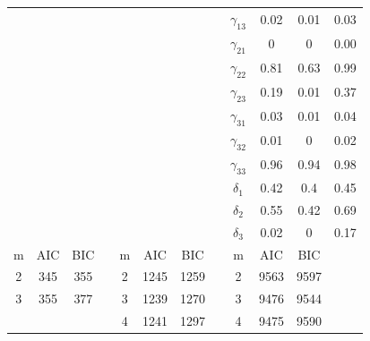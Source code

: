 \documentclass[]{interact}\usepackage[]{graphicx}\usepackage[dvipsnames]{xcolor}
\theoremstyle{plain}%
\theoremstyle{definition}
\theoremstyle{remark}
\begin{document}
\begin{table}[ht]
\begin{tabular}{cccc|cccc|cccc}
   &  &  &  &  &  &  &  & $\gamma_{13}$ & 0.02 & 0.01 & 0.03 \\ 
   &  &  &  &  &  &  &  & $\gamma_{21}$ & 0 & 0 & 0.00 \\ 
   &  &  &  &  &  &  &  & $\gamma_{22}$ & 0.81 & 0.63 & 0.99 \\ 
   &  &  &  &  &  &  &  & $\gamma_{23}$ & 0.19 & 0.01 & 0.37 \\ 
   &  &  &  &  &  &  &  & $\gamma_{31}$ & 0.03 & 0.01 & 0.04 \\ 
   &  &  &  &  &  &  &  & $\gamma_{32}$ & 0.01 & 0 & 0.02 \\ 
   &  &  &  &  &  &  &  & $\gamma_{33}$ & 0.96 & 0.94 & 0.98 \\ 
   &  &  &  &  &  &  &  & $\delta_{1}$ & 0.42 & 0.4 & 0.45 \\ 
   &  &  &  &  &  &  &  & $\delta_{2}$ & 0.55 & 0.42 & 0.69 \\ 
   &  &  &  &  &  &  &  & $\delta_{3}$ & 0.02 & 0 & 0.17 \\ 
   \hline
m & AIC & BIC &  & m & AIC & BIC &  & m & AIC & BIC &  \\ 
   \hline
2 & 345 & 355 &  & 2 & 1245 & 1259 &  & 2 & 9563 & 9597 &  \\ 
  3 & 355 & 377 &  & 3 & 1239 & 1270 &  & 3 & 9476 & 9544 &  \\ 
   &  &  &  & 4 & 1241 & 1297 &  & 4 & 9475 & 9590 &  \\ 
   \hline
\end{tabular}
\end{table}




  \providecommand{\huxb}[2]{\arrayrulecolor[RGB]{#1}\global\arrayrulewidth=#2pt}
  \providecommand{\huxvb}[2]{\color[RGB]{#1}\vrule width #2pt}
  \providecommand{\huxtpad}[1]{\rule{0pt}{#1}}
  \providecommand{\huxbpad}[1]{\rule[-#1]{0pt}{#1}}
\end{document}
